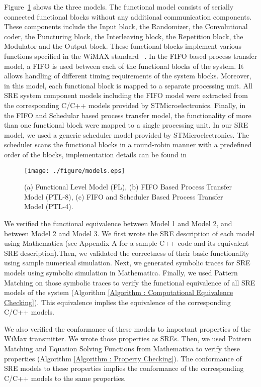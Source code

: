 \documentclass[submission,copyright,creativecommons]{eptcs}
\begin{document}
Figure~\ref{Figure_WiMax_Models} shows the three models. The functional model consists of serially connected functional blocks without any additional communication components. These components include the Input block, the Randomizer, the Convolutional coder, the Puncturing block, the Interleaving block, the Repetition block, the Modulator and the Output block. These functional blocks implement various functions specified in the WiMAX standard ~\cite{14}. In the FIFO based process transfer model, a FIFO is used between each of the functional blocks of the system. It allows handling of different timing requirements of the system blocks.  Moreover, in this model, each functional block is mapped to a separate processing unit. All SRE system component models including the FIFO model were extracted from the corresponding C/C++ models provided by STMicroelectronics. Finally, in the FIFO and Schedular based process transfer model, the functionality of more than one functional block were mapped to a single processing unit. In our SRE model, we used a generic scheduler model provided by STMicroelectronics. The scheduler scans the functional blocks in a round-robin manner with a predefined order of the blocks, implementation details can be found in~\cite{saleem_masters_thesis}

\begin{figure}[!htb]
\centering
\texttt{[image: ./figure/models.eps]}
\caption{\small{(a) Functional Level Model (FL), (b) FIFO Based Process Transfer Model (PTL-8), (c) FIFO and Scheduler Based Process Transfer Model (PTL-4).}}
\label{Figure_WiMax_Models}
\end{figure}

We verified the functional equivalence between Model 1 and Model 2, and between Model 2 and Model 3. We first wrote the SRE description of each model using Mathematica (see Appendix A for a sample C++ code and its equivalent SRE description).Then, we validated the correctness of their basic functionality using sample numerical simulation. Next, we generated symbolic traces for SRE models using symbolic simulation in Mathematica. Finally, we used Pattern Matching on those symbolic traces to verify the functional equivalence of all SRE models of the system (Algorithm \ref{Algorithm : Computational Equivalence Checking}). This equivalence implies the equivalence of the corresponding C/C++ models.

We also verified the conformance of these models to important properties of the WiMax transmitter. We wrote those properties as SREs. Then, we used Pattern Matching and Equation Solving Functions from Mathematica to verify these properties (Algorithm \ref{Algorithm : Property Checking}). The conformance of SRE models to these properties implies the conformance of the corresponding C/C++ models to the same properties.
\end{document}
